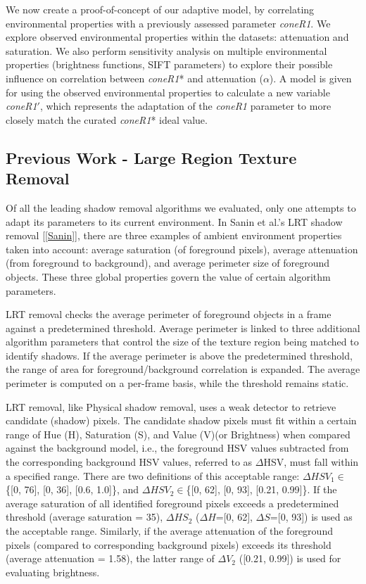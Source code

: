 We now create a proof-of-concept of our adaptive model, by correlating environmental properties with a previously assessed parameter \textit{coneR1}. We explore observed environmental properties within the datasets: attenuation and saturation. We also perform sensitivity analysis on multiple environmental properties (brightness functions, SIFT parameters) to explore their possible influence on correlation between \textit{coneR1}* and attenuation ($\alpha$). A model is given for using the observed environmental properties to calculate a new variable \textit{coneR1}$'$, which represents the adaptation of the \textit{coneR1} parameter to more closely match the curated \textit{coneR1}* ideal value.

\subsection{Previous Work - Large Region Texture Removal} \label{section:prevworkLRT}

Of all the leading shadow removal algorithms we evaluated, only one attempts to adapt its parameters to its current environment. In Sanin et al.'s LRT shadow removal [\ref{Sanin}], there are three examples of ambient environment properties taken into account: average saturation (of foreground pixels), average attenuation (from foreground to background), and average perimeter size of foreground objects. These three global properties govern the value of certain algorithm parameters.

LRT removal checks the average perimeter of foreground objects in a frame against a predetermined threshold. Average perimeter is linked to three additional algorithm parameters that control the size of the texture region being matched to identify shadows. If the average perimeter is above the predetermined threshold, the range of area for foreground/background correlation is expanded. The average perimeter is computed on a per-frame basis, while the threshold remains static.

LRT removal, like Physical shadow removal, uses a weak detector to retrieve candidate (shadow) pixels. The candidate shadow pixels must fit within a certain range of Hue (H), Saturation (S), and Value (V)(or Brightness) when compared against the background model, i.e., the foreground HSV values subtracted from the corresponding background HSV values, referred to as $\Delta$HSV, must fall within a specified range. There are two definitions of this acceptable range: $\Delta HSV_{1}\in$\{[0, 76], [0, 36], [0.6, 1.0]\}, and $\Delta HSV_{2}\in$\{[0, 62], [0, 93], [0.21, 0.99]\}. If the average saturation of all identified foreground pixels exceeds a predetermined threshold (average saturation = 35), $\Delta HS_{2}$ ($\Delta H$=[0, 62], $\Delta S$=[0, 93]) is used as the acceptable range. Similarly, if the average attenuation of the foreground pixels (compared to corresponding background pixels) exceeds its threshold (average attenuation = 1.58), the latter range of $\Delta V_{2}$ ([0.21, 0.99]) is used for evaluating brightness. 

